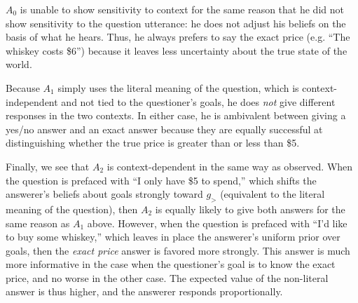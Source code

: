 \documentclass[12pt, floatsintext, jou]{apa6}
\begin{document}
$A_0$ is unable to show sensitivity to context for the same reason that he did not show sensitivity to the question utterance: he does not adjust his beliefs on the basis of what he hears. Thus, he always prefers to say the exact price (e.g. ``The whiskey costs \$6'') because it leaves less uncertainty about the true state of the world.

Because $A_1$ simply uses the literal meaning of the question, which is context-independent and not tied to the questioner's goals, he does \emph{not} give different responses in the two contexts. In either case, he is ambivalent between giving a yes/no answer and an exact answer because they are equally successful at distinguishing whether the true price is greater than or less than \$5. 

Finally, we see that $A_2$ is context-dependent in the same way as  observed. When the question is prefaced with ``I only have \$5 to spend,'' which shifts the answerer's beliefs about goals strongly toward $g_>$ (equivalent to the literal meaning of the question), then $A_2$ is equally likely to give both answers for the same reason as $A_1$ above. However, when the question is prefaced with ``I'd like to buy some whiskey,'' which leaves in place the answerer's uniform prior over goals, then the \emph{exact price} answer is favored more strongly. This answer is much more informative in the case when the questioner's goal is to know the exact price, and no worse in the other case. The expected value of the non-literal answer is thus higher, and the answerer responds proportionally. 
\end{document}
